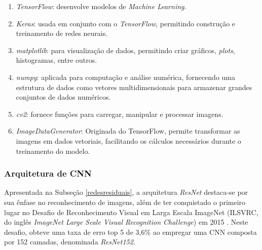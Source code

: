 \begin{enumerate}[label=\alph*)]
    \item \textit{TensorFlow}: desenvolve modelos de \textit{Machine Learning}.
    
    \item \textit{Keras}: usada em conjunto com o \textit{TensorFlow}, permitindo construção e treinamento de redes neurais.
    
        
    \item \textit{matplotlib}: para visualização de dados, permitindo criar gráficos, \textit{plots}, histogramas, entre outros.
    
    \item \textit{numpy}: aplicada para computação e análise numérica, fornecendo uma estrutura de dados como vetores multidimensionais para armazenar grandes conjuntos de dados numéricos.


    \item \textit{cv2}: fornece funções para carregar, manipular e processar imagens.




     \item \textit{ImageDataGenerator}: Originada do TensorFlow, permite transformar as imagens em dados vetoriais, facilitando os cálculos necessários durante o treinamento do modelo.
\end{enumerate}

\subsubsection{\esp Arquitetura de CNN} \label{arqCNN}

Apresentada na Subseção \ref{redesresiduais}, a arquitetura \textit{ResNet} destaca-se por sua ênfase no reconhecimento de imagens, além de ter conquistado o primeiro lugar no Desafio de Reconhecimento Visual em Larga Escala ImageNet (ILSVRC, do inglês \textit{ImageNet Large Scale Visual Recognition Challenge}) em 2015 \cite{resnet50analisys}. Neste desafio, obteve uma taxa de erro top 5 de 3,6\% ao empregar uma CNN composta por 152 camadas, denominada \textit{ResNet152}.


